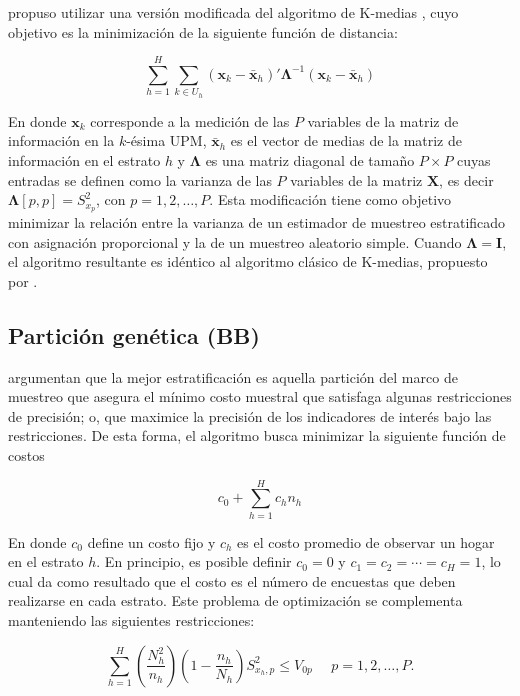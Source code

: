 \documentclass[
  12pt,
  spanish,
]{book}
\begin{document}
\citet{Jarque_1981} propuso utilizar una versión modificada del algoritmo de K-medias \citep{Macqueen_1967}, cuyo objetivo es la minimización de la siguiente función de distancia:

\[
\sum_{h=1}^H \sum_{k\in U_h}(\mathbf x_k - \bar {\mathbf x}_h)'\boldsymbol \Lambda^{-1}(\mathbf x_k - \bar {\mathbf x}_h)
\]

En donde \(\mathbf x_k\) corresponde a la medición de las \(P\) variables de la matriz de información en la \(k\)-ésima UPM, \(\bar {\mathbf x}_h\) es el vector de medias de la matriz de información en el estrato \(h\) y \(\boldsymbol \Lambda\) es una matriz diagonal de tamaño \(P \times P\) cuyas entradas se definen como la varianza de las \(P\) variables de la matriz \(\mathbf X\), es decir \(\boldsymbol \Lambda [p,p]=S^2_{x_p}\), con \(p = 1, 2, \ldots, P\). Esta modificación tiene como objetivo minimizar la relación entre la varianza de un estimador de muestreo estratificado con asignación proporcional y la de un muestreo aleatorio simple. Cuando \(\boldsymbol \Lambda = \mathbf I\), el algoritmo resultante es idéntico al algoritmo clásico de K-medias, propuesto por \citet{Macqueen_1967}.

\hypertarget{particiuxf3n-genuxe9tica-bb}{%
\subsection{Partición genética (BB)}\label{particiuxf3n-genuxe9tica-bb}}

\citet{Ballin_Barcaroli_2013} argumentan que la mejor estratificación es aquella partición del marco de muestreo que asegura el mínimo costo muestral que satisfaga algunas restricciones de precisión; o, que maximice la precisión de los indicadores de interés bajo las restricciones. De esta forma, el algoritmo busca minimizar la siguiente función de costos

\[
c_0 + \sum_{h=1}^{H} c_h n_h
\]

En donde \(c_0\) define un costo fijo y \(c_h\) es el costo promedio de observar un hogar en el estrato \(h\). En principio, es posible definir \(c_0=0\) y \(c_1 = c_2 = \cdots = c_H = 1\), lo cual da como resultado que el costo es el número de encuestas que deben realizarse en cada estrato. Este problema de optimización se complementa manteniendo las siguientes restricciones:

\[
\sum_{h=1}^{H} \left(\frac{N_h^2}{n_h}\right)\left(1-\frac{n_h}{N_h}\right) S^2_{x_h,p} \leq V_{0p}\ \ \  \ \ \ p = 1, 2, \ldots, P.
\]
\end{document}
